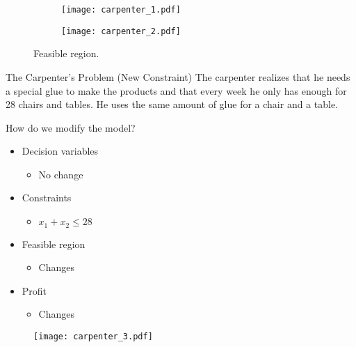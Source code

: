 \documentclass[11pt]{beamer}
\begin{document}
\begin{frame}
\begin{figure}
\centering
\begin{subfigure}
  \centering
  \texttt{[image: carpenter\_1.pdf]}
\end{subfigure}%
\begin{subfigure}
  \centering
  \texttt{[image: carpenter\_2.pdf]}
\end{subfigure}
\caption{Feasible region.}
\end{figure}

\end{frame}
\begin{frame}{The Carpenter's Problem (New Constraint)}
The carpenter realizes that he needs a special glue to make the products and that every week he only has enough for 28 chairs and tables. He uses the same amount of glue for a chair and a table.

How do we modify the model?
\begin{itemize}
\item Decision variables
\pause
\begin{itemize}
\item No change
\end{itemize}
\item Constraints
\begin{itemize}
\item $x_1 + x_2 \leq 28$
\end{itemize}
\item Feasible region
\begin{itemize}
\item Changes
\end{itemize}
\item Profit
\begin{itemize}
\item Changes
\end{itemize}
\end{itemize}

\end{frame}
\begin{frame}
\begin{figure}
\centering
\texttt{[image: carpenter\_3.pdf]}
\end{figure}
\end{frame}
\end{document}
